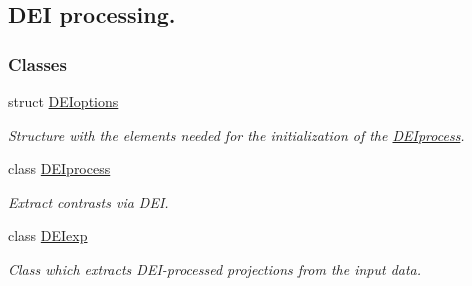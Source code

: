 \hypertarget{group__deiedei}{
\subsection{DEI processing.}
\label{group__deiedei}
}
\subsubsection*{Classes}
\begin{DoxyCompactItemize}
\item 
struct \hyperlink{structDEIoptions}{DEIoptions}
\begin{DoxyCompactList}\small\item\em Structure with the elements needed for the initialization of the \hyperlink{classDEIprocess}{DEIprocess}. \item\end{DoxyCompactList}\item 
class \hyperlink{classDEIprocess}{DEIprocess}
\begin{DoxyCompactList}\small\item\em Extract contrasts via DEI. \item\end{DoxyCompactList}\item 
class \hyperlink{classDEIexp}{DEIexp}
\begin{DoxyCompactList}\small\item\em Class which extracts DEI-\/processed projections from the input data. \item\end{DoxyCompactList}\end{DoxyCompactItemize}
